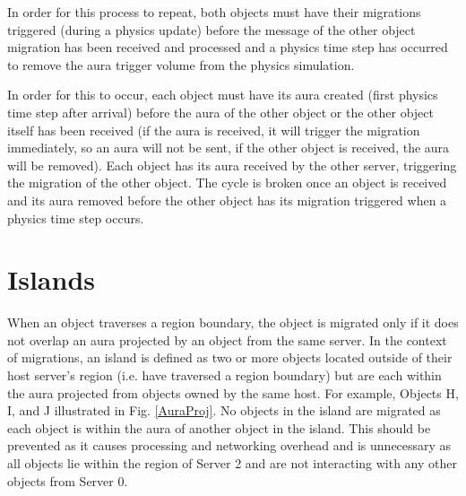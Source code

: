 In order for this process to repeat, both objects must have their migrations triggered (during a physics update) before the message of the other object migration has been received and processed and a physics time step has occurred to remove the aura trigger volume from the physics simulation.

In order for this to occur, each object must have its aura created (first physics time step after arrival) before the aura of the other object or the other object itself has been received (if the aura is received, it will trigger the migration immediately, so an aura will not be sent, if the other object is received, the aura will be removed). Each object has its aura received by the other server, triggering the migration of the other object. The cycle is broken once an object is received and its aura removed before the other object has its migration triggered when a physics time step occurs.



\section{Islands}
When an object traverses a region boundary, the object is migrated only if it does not overlap an aura projected by an object from the same server. In the context of migrations, an island is defined as two or more objects located outside of their host server's region (i.e. have traversed a region boundary) but are each within the aura projected from objects owned by the same host. For example, Objects H, I, and J illustrated in Fig. \ref{AuraProj}. No objects in the island are migrated as each object is within the aura of another object in the island. This should be prevented as it causes processing and networking overhead and is unnecessary as all objects lie within the region of Server 2 and are not interacting with any other objects from Server 0. 

